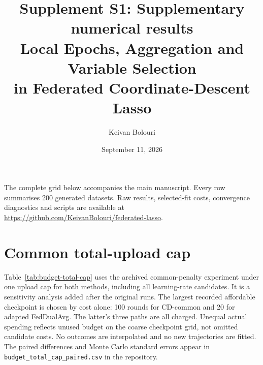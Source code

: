 \documentclass[10pt]{article}
\title{Supplement S1: Supplementary numerical results\\[4pt]\large Local Epochs, Aggregation and Variable Selection\\in Federated Coordinate-Descent Lasso}
\author{Keivan Bolouri}
\date{September 11, 2026}
\begin{document}
\maketitle
\noindent The complete grid below accompanies the main manuscript. Every row
summarises 200 generated datasets. Raw results, selected-fit costs,
convergence diagnostics and scripts are available at
\url{https://github.com/KeivanBolouri/federated-lasso}.

\clearpage
\section*{Common total-upload cap}
Table~\ref{tab:budget-total-cap} uses the archived common-penalty experiment
under one upload cap for both methods, including all learning-rate
candidates. It is a sensitivity analysis added after the original runs.
The largest recorded affordable checkpoint is chosen by cost alone:
100 rounds for CD-common and 20 for adapted FedDualAvg. The latter's
three paths are all charged. Unequal actual spending reflects unused
budget on the coarse checkpoint grid, not omitted candidate costs.
No outcomes are interpolated and no new trajectories are fitted.
The paired differences and Monte Carlo standard errors appear in
\texttt{budget\_total\_cap\_paired.csv} in the repository.

\end{document}
